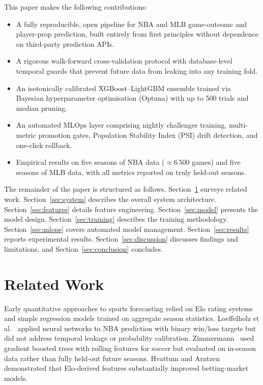 \documentclass[conference]{IEEEtran}
\begin{document}
This paper makes the following contributions:
\begin{itemize}
  \item A fully reproducible, open pipeline for NBA and MLB game-outcome
        and player-prop prediction, built entirely from first principles
        without dependence on third-party prediction APIs.
  \item A rigorous walk-forward cross-validation protocol with
        database-level temporal guards that prevent future data from
        leaking into any training fold.
  \item An isotonically calibrated XGBoost–LightGBM ensemble trained
        via Bayesian hyperparameter optimisation (Optuna) with
        up to 500 trials and median pruning.
  \item An automated MLOps layer comprising nightly challenger training,
        multi-metric promotion gates, Population Stability Index (PSI)
        drift detection, and one-click rollback.
  \item Empirical results on five seasons of NBA data
        (\(\approx\)6\,500 games) and five seasons of MLB data,
        with all metrics reported on truly held-out seasons.
\end{itemize}

The remainder of the paper is structured as follows.
Section~\ref{sec:related} surveys related work.
Section~\ref{sec:system} describes the overall system architecture.
Section~\ref{sec:features} details feature engineering.
Section~\ref{sec:model} presents the model design.
Section~\ref{sec:training} describes the training methodology.
Section~\ref{sec:mlops} covers automated model management.
Section~\ref{sec:results} reports experimental results.
Section~\ref{sec:discussion} discusses findings and limitations, and
Section~\ref{sec:conclusion} concludes.

\section{Related Work}
\label{sec:related}

Early quantitative approaches to sports forecasting relied on Elo rating
systems~\cite{elo1978} and simple regression models trained on
aggregate season statistics.  Loeffelholz et al.~\cite{loeffelholz2009}
applied neural networks to NBA prediction with binary win/loss targets
but did not address temporal leakage or probability calibration.
Zimmermann~\cite{zimmermann2016} used gradient boosted trees with
rolling features for soccer but evaluated on in-season data rather than
fully held-out future seasons.  Hvattum and
Arntzen~\cite{hvattum2010} demonstrated that Elo-derived features
substantially improved betting-market models.
\end{document}
